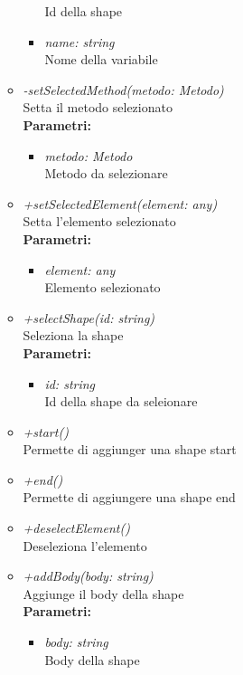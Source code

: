 \begin{itemize}
\begin{itemize}
\begin{itemize}
    			Id della shape
    			\item \emph{name: string}\\
    			Nome della variabile
    		\end{itemize}
    		\item \emph{-setSelectedMethod(metodo: Metodo)}\\
    		Setta il metodo selezionato\\
    		\textbf{Parametri:}
    		\begin{itemize}
    			\item \emph{metodo: Metodo}\\
    			Metodo da selezionare
    		\end{itemize}
    		\item \emph{+setSelectedElement(element: any)}\\
    		Setta l'elemento selezionato\\
    		\textbf{Parametri:}
    		\begin{itemize}
    			\item \emph{element: any}\\
    			Elemento selezionato
    		\end{itemize}
    		\item \emph{+selectShape(id: string)}\\
    		Seleziona la shape\\
    		\textbf{Parametri:}
    		\begin{itemize}
    			\item \emph{id: string}\\
    			Id della shape da seleionare
    		\end{itemize}
    		\item \emph{+start()}\\
    		Permette di aggiunger una shape start
    		\item \emph{+end()}\\
    		Permette di aggiungere una shape end
    		\item \emph{+deselectElement()}\\
    		Deseleziona l'elemento
    		\item \emph{+addBody(body: string)}\\
    		Aggiunge il body della shape\\
    		\textbf{Parametri:}
    		\begin{itemize}
    			\item \emph{body: string}\\
    			Body della shape

\end{itemize}
\end{itemize}
\end{itemize}
